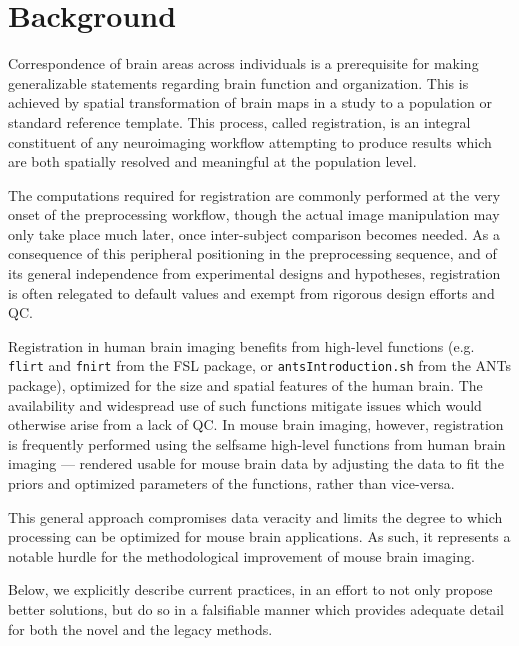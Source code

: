 \section{Background}
\label{sec:bg}

Correspondence of brain areas across individuals is a prerequisite for making generalizable statements regarding brain function and organization.
This is achieved by spatial transformation of brain maps in a study to a population or standard reference template.
This process, called registration, is an integral constituent of any neuroimaging workflow attempting to produce results which are both spatially resolved and meaningful at the population level.

The computations required for registration are commonly performed at the very onset of the preprocessing workflow,
though the actual image manipulation may only take place much later, once inter-subject comparison becomes needed.
As a consequence of this peripheral positioning in the preprocessing sequence, and of its general independence from experimental designs and hypotheses, registration is often relegated to default values and exempt from rigorous design efforts and QC.

Registration in human brain imaging benefits from high-level functions (e.g. \textcolor{mg}{\texttt{flirt}} and  \textcolor{mg}{\texttt{fnirt}} from the FSL package\cite{fsl}, or \textcolor{mg}{\texttt{antsIntroduction.sh}} from the ANTs package\cite{ants}), optimized for the size and spatial features of the human brain.
The availability and widespread use of such functions mitigate issues which would otherwise arise from a lack of QC.
In mouse brain imaging, however, registration is frequently performed using the selfsame high-level functions from human brain imaging --- rendered usable for mouse brain data by adjusting the data to fit the priors and optimized parameters of the functions, rather than vice-versa.

This general approach compromises data veracity and limits the degree to which processing can be optimized for mouse brain applications.
As such, it represents a notable hurdle for the methodological improvement of mouse brain imaging.

Below, we explicitly describe current practices, in an effort to not only propose better solutions, but do so in a falsifiable manner which provides adequate detail for both the novel and the legacy methods.

